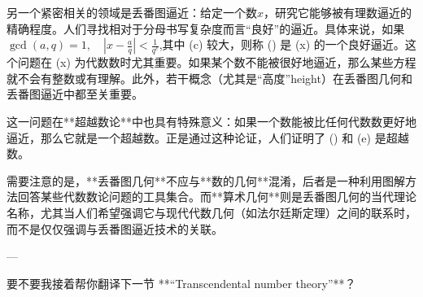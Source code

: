 另一个紧密相关的领域是丢番图逼近：给定一个数$x$，研究它能够被有理数逼近的精确程度。人们寻找相对于分母书写复杂度而言“良好”的逼近。具体来说，如果$\gcd(a,q)=1, \quad \left|x-\frac{a}{q}\right| < \frac{1}{q^{c}}$,其中 (c) 较大，则称 () 是 (x) 的一个良好逼近。这个问题在 (x) 为代数数时尤其重要。如果某个数不能被很好地逼近，那么某些方程就不会有整数或有理解。此外，若干概念（尤其是“高度”height）在丢番图几何和丢番图逼近中都至关重要。

这一问题在**超越数论**中也具有特殊意义：如果一个数能被比任何代数数更好地逼近，那么它就是一个超越数。正是通过这种论证，人们证明了 (\pi) 和 (e) 是超越数。

需要注意的是，**丢番图几何**不应与**数的几何**混淆，后者是一种利用图解方法回答某些代数数论问题的工具集合。而**算术几何**则是丢番图几何的当代理论名称，尤其当人们希望强调它与现代代数几何（如法尔廷斯定理）之间的联系时，而不是仅仅强调与丢番图逼近技术的关联。

---

要不要我接着帮你翻译下一节 **“Transcendental number theory”**？

